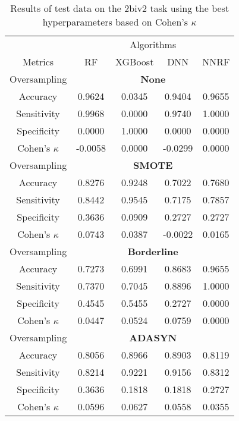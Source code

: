 \begin{table}[!htb]
\centering
\caption{Results of test data on the 2biv2 task using the best hyperparameters based on Cohen's $\kappa$}
\label{tab:2biv2_test_results}
\begin{tabular}{c | c c c c}
\hline
 & \multicolumn{4}{c}{Algorithms}\\ 
Metrics &RF & XGBoost & DNN & NNRF\\ 
\hline
Oversampling &\multicolumn{4}{|c}{\textbf{None}}\\ 
\hline
Accuracy & 0.9624 & 0.0345 & 0.9404 & 0.9655\\ 
Sensitivity & 0.9968 & 0.0000 & 0.9740 & 1.0000\\ 
Specificity & 0.0000 & 1.0000 & 0.0000 & 0.0000\\ 
Cohen's $\kappa$ & -0.0058 & 0.0000 & -0.0299 & 0.0000\\ 
\hline
Oversampling &\multicolumn{4}{|c}{\textbf{SMOTE}}\\ 
\hline
Accuracy & 0.8276 & 0.9248 & 0.7022 & 0.7680\\ 
Sensitivity & 0.8442 & 0.9545 & 0.7175 & 0.7857\\ 
Specificity & 0.3636 & 0.0909 & 0.2727 & 0.2727\\ 
Cohen's $\kappa$ & 0.0743 & 0.0387 & -0.0022 & 0.0165\\ 
\hline
Oversampling &\multicolumn{4}{|c}{\textbf{Borderline}}\\ 
\hline
Accuracy & 0.7273 & 0.6991 & 0.8683 & 0.9655\\ 
Sensitivity & 0.7370 & 0.7045 & 0.8896 & 1.0000\\ 
Specificity & 0.4545 & 0.5455 & 0.2727 & 0.0000\\ 
Cohen's $\kappa$ & 0.0447 & 0.0524 & 0.0759 & 0.0000\\ 
\hline
Oversampling &\multicolumn{4}{|c}{\textbf{ADASYN}}\\ 
\hline
Accuracy & 0.8056 & 0.8966 & 0.8903 & 0.8119\\ 
Sensitivity & 0.8214 & 0.9221 & 0.9156 & 0.8312\\ 
Specificity & 0.3636 & 0.1818 & 0.1818 & 0.2727\\ 
Cohen's $\kappa$ & 0.0596 & 0.0627 & 0.0558 & 0.0355\\ 
\hline
\end{tabular}
\end{table}

